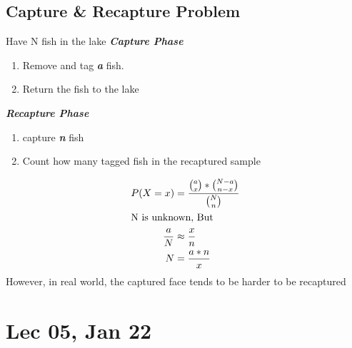 \documentclass[11pt]{article}
\begin{document}
            \subsection{Capture \& Recapture Problem}   
                Have N fish in the lake 
                \textbf{\textit{Capture Phase}}
                    \begin{enumerate}
                        \item Remove and tag \textbf{\textit{a}} fish.
                        \item Return the fish to the lake 
                    \end{enumerate}
                \textbf{\textit{Recapture Phase}}
                    \begin{enumerate}
                        \item capture \textbf{\textit{n}} fish
                        \item Count how many tagged fish in the recaptured sample
                    \end{enumerate}
                \begin{align*}
                        P(X=x) &= \frac{\binom{a}{x}*\binom{N-a}{n-x}}{\binom{N}{n}}\\
                    \intertext{N is unknown, But}
                        \frac{a}{N} &\approx \frac{x}{n}\\
                        N &= \frac{a*n}{x}\\
                \end{align*}
                However, in real world, the captured face tends to be harder to be recaptured
    \newpage
    \section{Lec 05, Jan 22}
\end{document}
